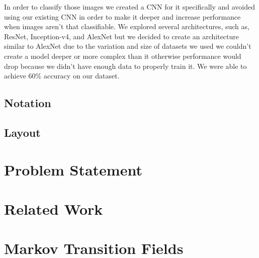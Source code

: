 \documentclass{turabian-thesis}
\begin{document}
In order to classify those images we created a CNN for it specifically and avoided using our existing CNN in order to make it deeper and increase performance when images aren’t that classifiable. We explored several architectures, such as, ResNet, Inception-v4, and AlexNet but we decided to create an architecture similar to AlexNet due to the variation and size of datasets we used we couldn’t create a model deeper or more complex than it otherwise performance would drop because we didn’t have enough data to properly train it. We were able to achieve 60\% accuracy on our dataset.

\section{Notation}

\section{Layout}

\chapter{Problem Statement}


\chapter{Related Work}
 

\chapter{Markov Transition Fields}

\end{document}
